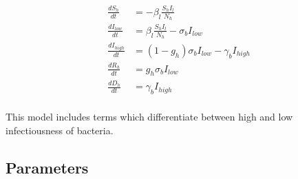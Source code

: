 \documentclass [letterpaper, 12pt] {article}
\begin{document}
\begin{align}
	\frac{dS_h}{dt} &= -\beta_l \frac{S_h I_l}{N_h} \\
	\frac{dI_{low}}{dt} &= \beta_l \frac{S_h I_l}{N_h} - \sigma_b I_{low} \\
	\frac{dI_{high}}{dt} &= (1-g_h) \sigma_b I_{low} - \gamma_b I_{high} \\
	\frac{dR_h}{dt} &= g_h \sigma_b I_{low} \\
	\frac{dD_h}{dt} &= \gamma_b I_{high} \\
\end{align}

This model includes terms which differentiate between high and low infectiousness of bacteria.

\pagebreak

\subsection{Parameters}
\end{document}
